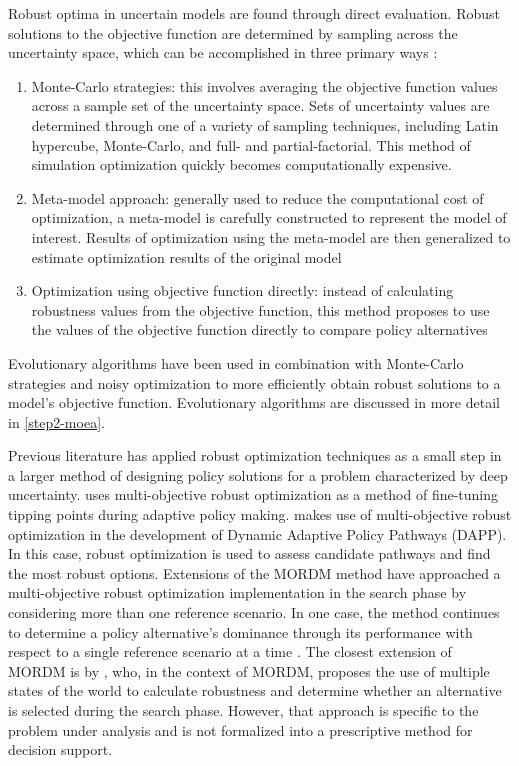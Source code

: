     Robust optima in uncertain models are found through direct evaluation. Robust solutions to the objective function are determined by sampling across the uncertainty space, which can be accomplished in three primary ways \citep{Beyer2007}:
    
    \begin{enumerate}
        \item Monte-Carlo strategies: this involves averaging the objective function values across a sample set of the uncertainty space. Sets of uncertainty values are determined through one of a variety of sampling techniques, including Latin hypercube, Monte-Carlo, and full- and partial-factorial. This method of simulation optimization quickly becomes computationally expensive. 
        \item Meta-model approach: generally used to reduce the computational cost of optimization, a meta-model is carefully constructed to represent the model of interest. Results of optimization using the meta-model are then generalized to estimate optimization results of the original model \citep{Zhou2017}
        \item Optimization using objective function directly: instead of calculating robustness values from the objective function, this method proposes to use the values of the objective function directly to compare policy alternatives \citep{Beyer2007}
    \end{enumerate}
    
    Evolutionary algorithms have been used in combination with Monte-Carlo strategies and noisy optimization to more efficiently obtain robust solutions to a model’s objective function. Evolutionary algorithms are discussed in more detail in \cref{step2-moea}. 

    Previous literature has applied robust optimization techniques as a small step in a larger method of designing policy solutions for a problem characterized by deep uncertainty. \citet{HamaratLoonen2014} uses multi-objective robust optimization as a method of fine-tuning tipping points during adaptive policy making. \citet{Kwakkel2015} makes use of multi-objective robust optimization in the development of Dynamic Adaptive Policy Pathways (DAPP). In this case, robust optimization is used to assess candidate pathways and find the most robust options. Extensions of the MORDM method have approached a multi-objective robust optimization implementation in the search phase by considering more than one reference scenario. In one case, the method continues to determine a policy alternative's dominance through its performance with respect to a single reference scenario at a time \citep{Watson2017}. The closest extension of MORDM is by \citet{Trindade2017}, who, in the context of MORDM, proposes the use of multiple states of the world to calculate robustness and determine whether an alternative is selected during the search phase. However, that approach is specific to the problem under analysis and is not formalized into a prescriptive method for decision support. 
    

